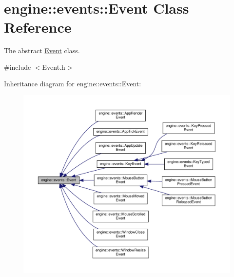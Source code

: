 \hypertarget{classengine_1_1events_1_1Event}{}\section{engine\+:\+:events\+:\+:Event Class Reference}
\label{classengine_1_1events_1_1Event}


The abstract \hyperlink{classengine_1_1events_1_1Event}{Event} class.  




{\ttfamily \#include $<$Event.\+h$>$}



Inheritance diagram for engine\+:\+:events\+:\+:Event\+:\nopagebreak
\begin{figure}[H]
\begin{center}
\leavevmode
\includegraphics[width=350pt]{classengine_1_1events_1_1Event__inherit__graph}
\end{center}
\end{figure}
